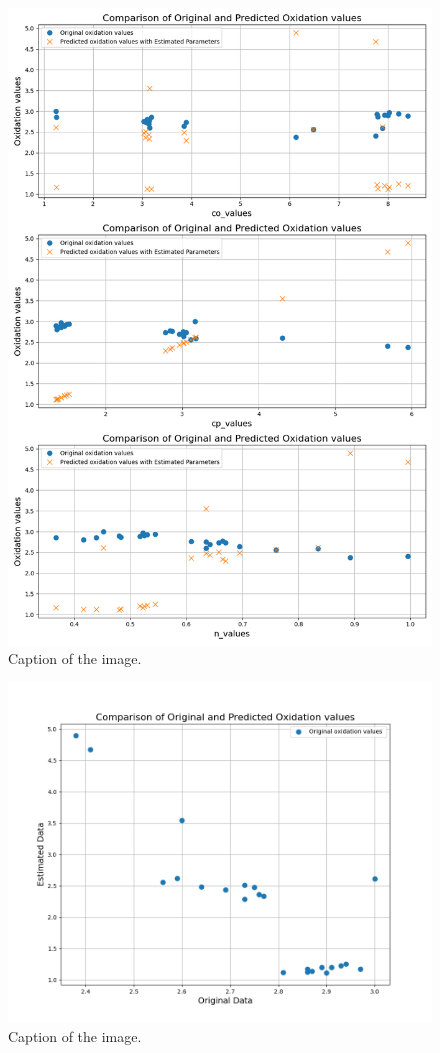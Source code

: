\documentclass[a4paper,12pt]{article} %
\begin{document}
\begin{figure}[ht]
    \centering
    \includegraphics[width=1\textwidth]{GNM_Q2_ParamComp.png}
    \caption{Caption of the image.}
\end{figure}

\begin{figure}[ht]
    \centering
    \includegraphics[width=1\textwidth]{GNM_Q2_ParamComp_1.png}
    \caption{Caption of the image.}
\end{figure}
\end{document}
